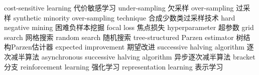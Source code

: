 {cost-sensitive learning}
{代价敏感学习}
{under-sampling}
{欠采样}
{over-sampling}
{过采样}
{synthetic minority over-sampling technique}
{合成少数类过采样技术}
{hard negative mining}
{困难负样本挖掘}
{focal loss}
{焦点损失}
{hyperparameter}
{超参数}
{grid search}
{网格搜索}
{random search}
{随机搜索}
{tree-structured Parzen estimator}
{树结构Parzen估计器}
{expected improvement}
{期望改进}
{successive halving algorithm}
{逐次减半算法}
{asynchronous successive halving algorithm}
{异步逐次减半算法}
{bracket}
{分支}
{reinforcement learning}
{强化学习}
{representation learning}
{表示学习}
